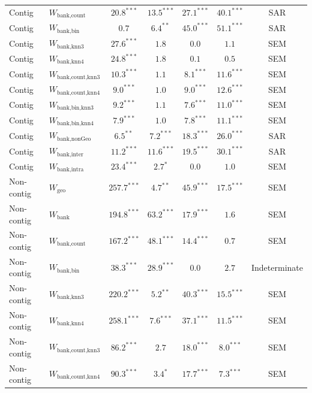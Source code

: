 \begin{table}[htbp]
\begin{tabular}{llccccc}
    Contig & $W_{\text{bank,count}}$ & $20.8^{***}$ & $13.5^{***}$ & $27.1^{***}$ & $40.1^{***}$ & SAR \\
    Contig & $W_{\text{bank,bin}}$ & $0.7$ & $6.4^{**}$ & $45.0^{***}$ & $51.1^{***}$ & SAR \\
    Contig & $W_{\text{bank,knn3}}$ & $27.6^{***}$ & $1.8$ & $0.0$ & $1.1$ & SEM \\
    Contig & $W_{\text{bank,knn4}}$ & $24.8^{***}$ & $1.8$ & $0.1$ & $0.5$ & SEM \\
    Contig & $W_{\text{bank,count,knn3}}$ & $10.3^{***}$ & $1.1$ & $8.1^{***}$ & $11.6^{***}$ & SEM \\
    Contig & $W_{\text{bank,count,knn4}}$ & $9.0^{***}$ & $1.0$ & $9.0^{***}$ & $12.6^{***}$ & SEM \\
    Contig & $W_{\text{bank,bin,knn3}}$ & $9.2^{***}$ & $1.1$ & $7.6^{***}$ & $11.0^{***}$ & SEM \\
    Contig & $W_{\text{bank,bin,knn4}}$ & $7.9^{***}$ & $1.0$ & $7.8^{***}$ & $11.1^{***}$ & SEM \\
    Contig & $W_{\text{bank,nonGeo}}$ & $6.5^{**}$ & $7.2^{***}$ & $18.3^{***}$ & $26.0^{***}$ & SAR \\
    Contig & $W_{\text{bank,inter}}$ & $11.2^{***}$ & $11.6^{***}$ & $19.5^{***}$ & $30.1^{***}$ & SAR \\
    Contig & $W_{\text{bank,intra}}$ & $23.4^{***}$ & $2.7^{*}$ & $0.0$ & $1.0$ & SEM \\
    \addlinespace
    Non-contig & $W_{\text{geo}}$ & $257.7^{***}$ & $4.7^{**}$ & $45.9^{***}$ & $17.5^{***}$ & SEM \\
    Non-contig & $W_{\text{bank}}$ & $194.8^{***}$ & $63.2^{***}$ & $17.9^{***}$ & $1.6$ & SEM \\
    Non-contig & $W_{\text{bank,count}}$ & $167.2^{***}$ & $48.1^{***}$ & $14.4^{***}$ & $0.7$ & SEM \\
    Non-contig & $W_{\text{bank,bin}}$ & $38.3^{***}$ & $28.9^{***}$ & $0.0$ & $2.7$ & Indeterminate \\
    Non-contig & $W_{\text{bank,knn3}}$ & $220.2^{***}$ & $5.2^{**}$ & $40.3^{***}$ & $15.5^{***}$ & SEM \\
    Non-contig & $W_{\text{bank,knn4}}$ & $258.1^{***}$ & $7.6^{***}$ & $37.1^{***}$ & $11.5^{***}$ & SEM \\
    Non-contig & $W_{\text{bank,count,knn3}}$ & $86.2^{***}$ & $2.7$ & $18.0^{***}$ & $8.0^{***}$ & SEM \\
    Non-contig & $W_{\text{bank,count,knn4}}$ & $90.3^{***}$ & $3.4^{*}$ & $17.7^{***}$ & $7.3^{***}$ & SEM \\

\end{tabular}
\end{table}
